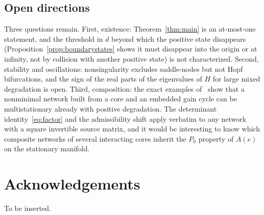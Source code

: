 \documentclass[11pt,a4paper]{article}
\theoremstyle{plain}
\theoremstyle{definition}
\theoremstyle{remark}
\numberwithin{equation}{section}
\begin{document}
\subsection*{Open directions}
Three questions remain. First, existence: Theorem~\ref{thm:main} is an at-most-one statement, and the threshold in $d$ beyond which the positive state disappears (Proposition~\ref{prop:boundarystates} shows it must disappear into the origin or at infinity, not by collision with another positive state) is not characterized. Second, stability and oscillations: nonsingularity excludes saddle-nodes but not Hopf bifurcations, and the sign of the real parts of the eigenvalues of $H$ for large mixed degradation is open. Third, composition: the exact examples of~\cite{TypeIIpos} show that a nonminimal network built from a core and an embedded gain cycle can be multistationary already with positive degradation. The determinant identity~\eqref{eq:factor} and the admissibility shift apply verbatim to any network with a square invertible source matrix, and it would be interesting to know which composite networks of several interacting cores inherit the $P_0$ property of $A(e)$ on the stationary manifold.

\section*{Acknowledgements}
To be inserted.



\end{document}
